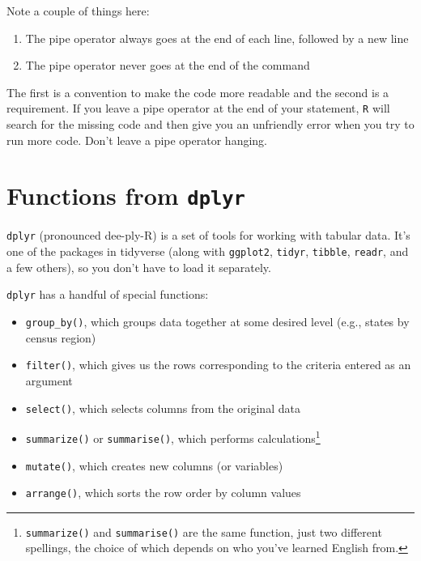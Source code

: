\documentclass[
]{book}
\begin{document}
Note a couple of things here:

\begin{enumerate}
\def\labelenumi{\arabic{enumi}.}
\item
  The pipe operator always goes at the end of each line, followed by a new line
\item
  The pipe operator never goes at the end of the command
\end{enumerate}

The first is a convention to make the code more readable and the second is a requirement. If you leave a pipe operator at the end of your statement, \texttt{R} will search for the missing code and then give you an unfriendly error when you try to run more code. Don't leave a pipe operator hanging.

\hypertarget{functions-from-dplyr}{%
\section{\texorpdfstring{Functions from \texttt{dplyr}}{Functions from dplyr}}\label{functions-from-dplyr}}

\texttt{dplyr} (pronounced dee-ply-R) is a set of tools for working with tabular data. It's one of the packages in tidyverse (along with \texttt{ggplot2}, \texttt{tidyr}, \texttt{tibble}, \texttt{readr}, and a few others), so you don't have to load it separately.

\texttt{dplyr} has a handful of special functions:

\begin{itemize}
\item
  \texttt{group\_by()}, which groups data together at some desired level (e.g., states by census region)
\item
  \texttt{filter()}, which gives us the rows corresponding to the criteria entered as an argument
\item
  \texttt{select()}, which selects columns from the original data
\item
  \texttt{summarize()} or \texttt{summarise()}, which performs calculations\footnote{\texttt{summarize()} and \texttt{summarise()} are the same function, just two different spellings, the choice of which depends on who you've learned English from.}
\item
  \texttt{mutate()}, which creates new columns (or variables)
\item
  \texttt{arrange()}, which sorts the row order by column values
\end{itemize}
\end{document}
